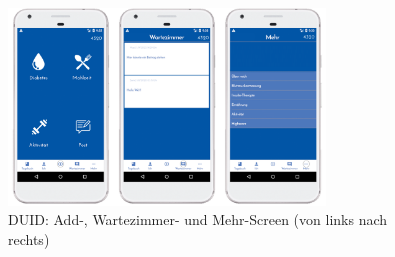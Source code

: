 \begin{figure}[H]
	\centering
	\includegraphics[width=0.75\textwidth]{images/drei_digital.png}
	\captionsetup{justification=centering}
	\caption{DUID: Add-, Wartezimmer- und Mehr-Screen (von links nach rechts)}
	\label{img:DUIdreiscreen}
\end{figure}




